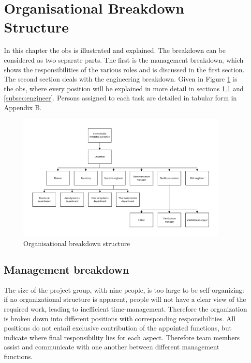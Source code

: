 \section{Organisational Breakdown Structure}\label{cha:OBS}
In this chapter the \gls{obs} is illustrated and explained. The breakdown can be considered as two separate parts. The first is the management breakdown, which shows the responsibilities of the various roles and is discussed in the first section. The second section deals with the engineering breakdown. Given in Figure \ref{fig:OBS} is the \gls{obs}, where every position will be explained in more detail in sections \ref{subsec:management} and \ref{subsec:engineer}. Persons assigned to each task are detailed in tabular form in Appendix B.

\begin{figure}[h]
\centering
\includegraphics[width=0.95\textwidth]{./Figure/OBS.pdf}
\caption{Organisational breakdown structure} \label{fig:OBS}
\end{figure}

\subsection{Management breakdown}\label{subsec:management}
The size of the project group, with nine people, is too large to be self-organizing: if no organizational structure is apparent, people will not have a clear view of the required work, leading to inefficient time-management. Therefore the organization is broken down into different positions with corresponding responsibilities. All positions do not entail exclusive contribution of the appointed functions, but indicate where final responsibility lies for each aspect. Therefore team members assist and communicate with one another between different management functions.


